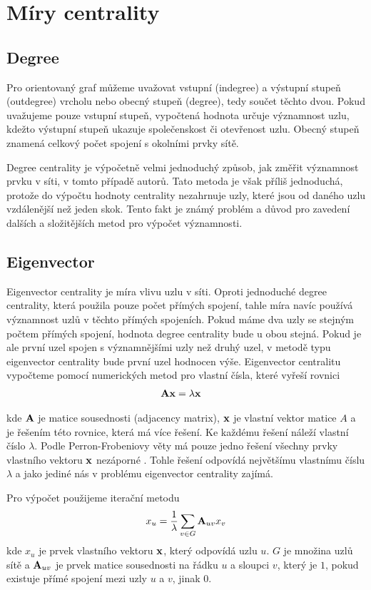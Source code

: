\documentclass[12pt,titlepage]{report}
\begin{document}
\section{Míry centrality}
\subsection{Degree}
Pro orientovaný graf můžeme uvažovat vstupní (indegree) a výstupní stupeň
(outdegree) vrcholu nebo obecný stupeň (degree), tedy součet těchto dvou. Pokud
uvažujeme pouze vstupní stupeň, vypočtená hodnota určuje významnost uzlu,
kdežto výstupní stupeň ukazuje společenskost či otevřenost uzlu. Obecný stupeň
znamená celkový počet spojení s okolními prvky sítě.

Degree centrality je výpočetně velmi jednoduchý způsob, jak změřit významnost
prvku v síti, v tomto případě autorů. Tato metoda je však příliš jednoduchá,
protože do výpočtu hodnoty centrality nezahrnuje uzly, které jsou od daného
uzlu vzdálenější než jeden skok. Tento fakt je známý problém a důvod pro
zavedení dalších a složitějších metod pro výpočet významnosti.

\subsection{Eigenvector}
Eigenvector centrality je míra vlivu uzlu v síti. Oproti jednoduché degree
centrality, která použila pouze počet přímých spojení, tahle míra navíc používá
významnost uzlů v těchto přímých spojeních. Pokud máme dva uzly se stejným
počtem přímých spojení, hodnota degree centrality bude u obou stejná. Pokud je
ale první uzel spojen s významnějšími uzly než druhý uzel, v metodě typu
eigenvector centrality bude první uzel hodnocen výše. Eigenvector centralitu
vypočteme pomocí numerických metod pro vlastní čísla, které vyřeší rovnici 
\begin{align}
{\bf Ax} &= \lambda {\bf x}
\end{align}

kde ${\bf A}$ je matice sousednosti (adjacency matrix), ${\bf x}$ je vlastní
vektor matice $A$ a je řešením této rovnice, která má více řešení. Ke každému
řešení náleží vlastní číslo $\lambda$. Podle Perron-Frobeniovy věty má pouze
jedno řešení všechny prvky vlastního vektoru ${\bf x}$ nezáporné
\cite{langvillemeyer}. Tohle řešení odpovídá největšímu vlastnímu číslu
$\lambda$ a jako jediné nás v problému eigenvector centrality zajímá. 

Pro výpočet použijeme iterační metodu
\begin{align}
x_u &=  \frac{1}{\lambda} \displaystyle\sum_{v \in G} {\bf A}_{uv} x_v \\
\end{align}
kde $x_u$ je prvek vlastního vektoru ${\bf x}$, který odpovídá uzlu $u$. $G$ je
množina uzlů sítě a ${\bf A}_{uv}$ je prvek matice sousednosti na řádku $u$ a
sloupci $v$, který je $1$, pokud existuje přímé spojení mezi uzly $u$ a $v$,
jinak $0$.
\end{document}

